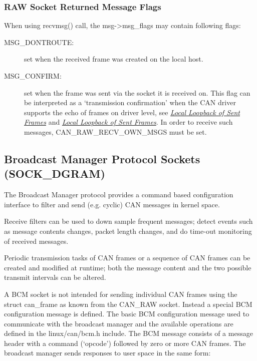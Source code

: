 \documentclass[a4paper,8pt,english]{sphinxmanual}
\begin{document}
\subsubsection{RAW Socket Returned Message Flags}
\label{networking/can:raw-socket-returned-message-flags}
When using recvmsg() call, the msg-\textgreater{}msg\_flags may contain following flags:
\begin{description}
\item[{MSG\_DONTROUTE:}] \leavevmode
set when the received frame was created on the local host.

\item[{MSG\_CONFIRM:}] \leavevmode
set when the frame was sent via the socket it is received on.
This flag can be interpreted as a `transmission confirmation' when the
CAN driver supports the echo of frames on driver level, see
{\hyperref[networking/can:socketcan\string-local\string-loopback1]{\emph{Local Loopback of Sent Frames}}} and {\hyperref[networking/can:socketcan\string-local\string-loopback2]{\emph{Local Loopback of Sent Frames}}}.
In order to receive such messages, CAN\_RAW\_RECV\_OWN\_MSGS must be set.

\end{description}


\subsection{Broadcast Manager Protocol Sockets (SOCK\_DGRAM)}
\label{networking/can:broadcast-manager-protocol-sockets-sock-dgram}
The Broadcast Manager protocol provides a command based configuration
interface to filter and send (e.g. cyclic) CAN messages in kernel space.

Receive filters can be used to down sample frequent messages; detect events
such as message contents changes, packet length changes, and do time-out
monitoring of received messages.

Periodic transmission tasks of CAN frames or a sequence of CAN frames can be
created and modified at runtime; both the message content and the two
possible transmit intervals can be altered.

A BCM socket is not intended for sending individual CAN frames using the
struct can\_frame as known from the CAN\_RAW socket. Instead a special BCM
configuration message is defined. The basic BCM configuration message used
to communicate with the broadcast manager and the available operations are
defined in the linux/can/bcm.h include. The BCM message consists of a
message header with a command (`opcode') followed by zero or more CAN frames.
The broadcast manager sends responses to user space in the same form:
\end{document}
